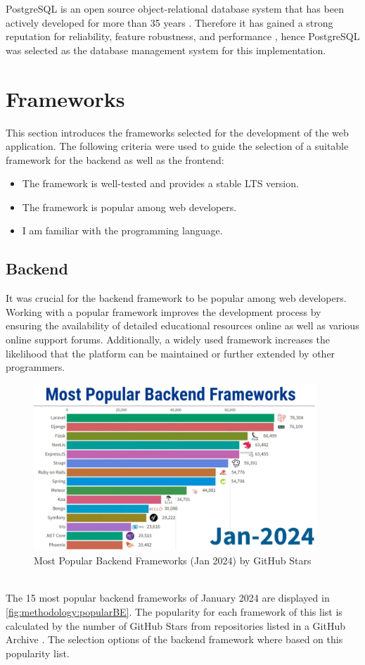 PostgreSQL is an open source object-relational database system that has been actively developed for more than 35 years \cite{methodology:db}. Therefore it has gained a strong reputation for reliability, feature robustness, and performance \cite{methodology:db}, hence PostgreSQL was selected as the database management system for this implementation.

\section{Frameworks}
\label{sec:methodology:frameworks}
This section introduces the frameworks selected for the development of the web application. The following criteria were used to guide the selection of a suitable framework for the backend as well as the frontend:
\begin{itemize}
    \item The framework is well-tested and provides a stable \ac{LTS} version.
    \item The framework is popular among web developers.
    \item I am familiar with the programming language.
\end{itemize}

\subsection{Backend}
\label{subsec:methodology:frameworks:backend}
It was crucial for the backend framework to be popular among web developers. Working with a popular framework improves the development process by ensuring the availability of detailed educational resources online as well as various online support forums. Additionally, a widely used framework increases the likelihood that the platform can be maintained or further extended by other programmers.
\begin{figure}[htbp]
 \centering
 \includegraphics[width=0.95\textwidth]{gfx/figures/Popular_BE.png}
 \caption{Most Popular Backend Frameworks (Jan 2024) by GitHub Stars \cite{backend:popularity}}
 \label{fig:methodology:popularBE}
\end{figure}
~\\
The 15 most popular backend frameworks of January 2024 are displayed in \autoref{fig:methodology:popularBE}. The popularity for each framework of this list is calculated by the number of GitHub Stars from repositories listed in a GitHub Archive \cite{backend:popularity}. The selection options of the backend framework where based on this popularity list.

